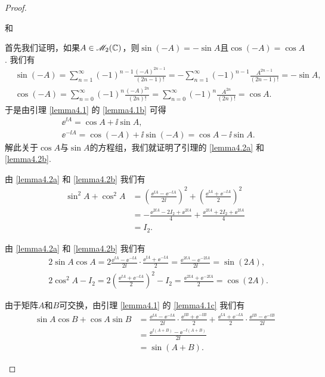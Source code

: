 \begin{proof}
  \begin{inparaenum}[(a)]
    \item 和 \item 首先我们证明，如果$A\in\mathscr M_2(\mathbb C)$，则$\sin(-A)=-\sin A$且$\cos(-A)=\cos A$. 我们有
        \begin{align*}
          & \sin (-A) = \sum_{n=1}^\infty (-1)^{n-1}\frac{(-A)^{2n-1}}{(2n-1)!} =
          - \sum_{n=1}^\infty(-1)^{n-1} \frac{A^{2n-1}}{(2n-1)!} = -\sin A,\\
          & \cos (-A) = \sum_{n=0}^\infty(-1)^n
          \frac{(-A)^{2n}}{(2n)!} = \sum_{n=0}^\infty(-1)^n
          \frac{A^{2n}}{(2n)!} = \cos A.
        \end{align*}
        于是由引理 \ref{lemma4.1} 的 \ref{lemma4.1b} 可得
        \begin{align*}
          & \ee^{\ii A} = \cos A + \ii \sin A, \\
          & \ee^{-\ii A} = \cos (-A) + \ii \sin(-A) = \cos A - \ii \sin A.
        \end{align*}
       解此关于$\cos A$与$\sin A$的方程组，我们就证明了引理的 \ref{lemma4.2a} 和 \ref{lemma4.2b}.

    \item 由 \ref{lemma4.2a} 和 \ref{lemma4.2b} 我们有
        \begin{align*}
          \sin^2A + \cos^2A & = \left( \frac{\ee^{\ii A}-\ee^{-\ii A}}{2\ii} \right)^2 + \left( \frac{\ee^{\ii A} + \ee^{-\ii A}}2 \right)^2 \\
          & = -\frac{\ee^{2\ii A}-2I_2+\ee^{2\ii A}}4 + \frac{\ee^{2\ii A}+2I_2+\ee^{2\ii A}}4 \\
          & = I_2.
        \end{align*}

    \item 由 \ref{lemma4.2a} 和 \ref{lemma4.2b} 我们有
        \begin{align*}
          & 2\sin A\cos A = 2\frac{\ee^{\ii A}-\ee^{-\ii A}}{2\ii} \cdot \frac{\ee^{\ii A}+\ee^{-\ii A}}2 =
          \frac{\ee^{2\ii A}-\ee^{-2\ii A}}{2\ii} = \sin(2A), \\
          & 2\cos^2A - I_2 = 2\left(\frac{\ee^{\ii A}+\ee^{-\ii A}}2\right)^2 - I_2 = \frac{\ee^{2\ii A}+\ee^{-2\ii A}}2 = \cos(2A).
        \end{align*}

    \item 由于矩阵$A$和$B$可交换，由引理 \ref{lemma4.1} 的 \ref{lemma4.1c} 我们有
        \begin{align*}
          \sin A\cos B + \cos A\sin B & =
          \frac{\ee^{\ii A}-\ee^{-\ii A}}{2\ii} \cdot \frac{\ee^{\ii B}+\ee^{-\ii B}}2 + \frac{\ee^{\ii A}+\ee^{-\ii A}}2 \cdot \frac{\ee^{\ii B}-\ee^{-\ii B}}{2\ii} \\
          & = \frac{\ee^{\ii(A+B)} - \ee^{-\ii(A+B)}}{2\ii} \\
          & = \sin(A+B).
        \end{align*}


\end{inparaenum}
\end{proof}
